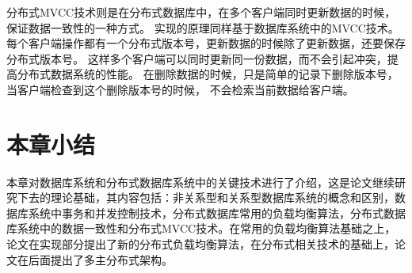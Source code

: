 分布式MVCC技术则是在分布式数据库中，在多个客户端同时更新数据的时候，保证数据一致性的一种方式。
实现的原理同样基于数据库系统中的MVCC技术。
每个客户端操作都有一个分布式版本号，更新数据的时候除了更新数据，还要保存分布式版本号。
这样多个客户端可以同时更新同一份数据，而不会引起冲突，提高分布式数据系统的性能。
在删除数据的时候，只是简单的记录下删除版本号，当客户端检查到这个删除版本号的时候，
不会检索当前数据给客户端。
\section{本章小结}
本章对数据库系统和分布式数据库系统中的关键技术进行了介绍，这是论文继续研究下去的理论基础，其内容包括：非关系型和关系型数据库系统的概念和区别，数据库系统中事务和并发控制技术，分布式数据库常用的负载均衡算法，分布式数据库系统中的数据一致性和分布式MVCC技术。在常用的负载均衡算法基础之上，论文在实现部分提出了新的分布式负载均衡算法，在分布式相关技术的基础上，论文在后面提出了多主分布式架构。